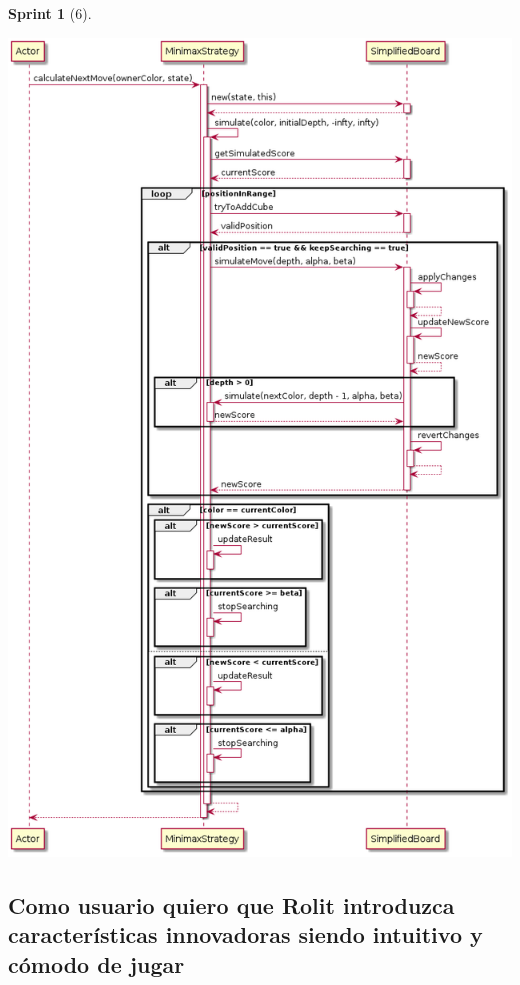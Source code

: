\documentclass{article}
\theoremstyle{break}
\newtheorem*{sprint}{Sprint}
\begin{document}
\begin{sprint}[6]
\begin{center}
\centering
\includegraphics[scale=0.5]{Minimax.calculateNextMove()-Sprint6.png}
\end{center}

\end{sprint}

\subsection{Como usuario quiero que Rolit introduzca características innovadoras siendo intuitivo y cómodo de jugar}
\end{document}
